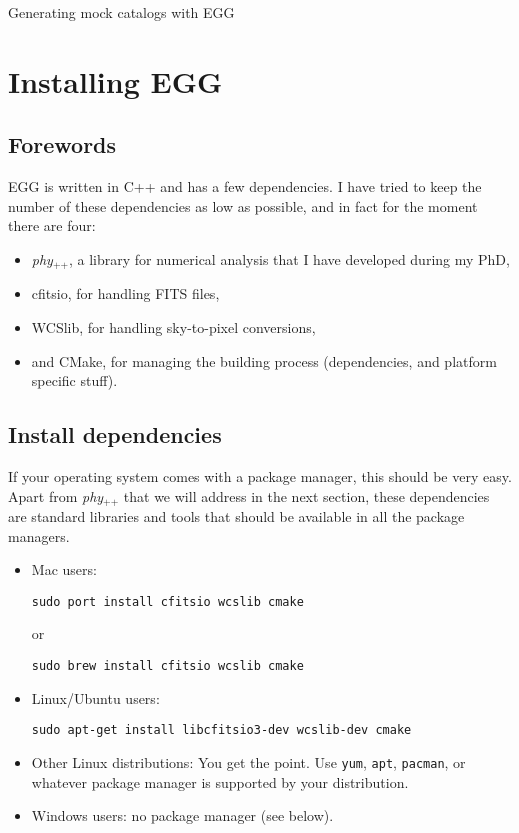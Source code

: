 \documentclass[12pt,a4paper]{article}
\newcommand{\phypp}{\textit{phy}$_{\text{++}}$\xspace}
\newcommand{\egg}{\textsc{EGG}\xspace}
\begin{document}

\begin{center}
{\huge Generating mock catalogs with \egg}
\end{center}

\section{Installing \egg}

\subsection{Forewords}

\egg is written in C++ and has a few dependencies. I have tried to keep the number of these dependencies as low as possible, and in fact for the moment there are four:

\begin{itemize}
\item \phypp, a library for numerical analysis that I have developed during my PhD,
\item cfitsio, for handling FITS files,
\item WCSlib, for handling sky-to-pixel conversions,
\item and CMake, for managing the building process (dependencies, and platform specific stuff).
\end{itemize}

\subsection{Install dependencies}

If your operating system comes with a package manager, this should be very easy. Apart from \phypp that we will address in the next section, these dependencies are standard libraries and tools that should be available in all the package managers.

\begin{itemize}
\item Mac users:
\begin{verbatim}
sudo port install cfitsio wcslib cmake
\end{verbatim}
or
\begin{verbatim}
sudo brew install cfitsio wcslib cmake
\end{verbatim}
\item Linux/Ubuntu users:
\begin{verbatim}
sudo apt-get install libcfitsio3-dev wcslib-dev cmake
\end{verbatim}
\item Other Linux distributions: You get the point. Use \texttt{yum}, \texttt{apt}, \texttt{pacman}, or whatever package manager is supported by your distribution.
\item Windows users: no package manager (see below).
\end{itemize}
\end{document}

